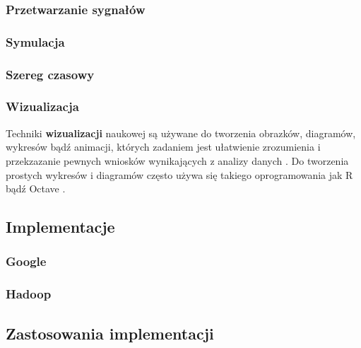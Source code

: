 \subsubsection{Przetwarzanie sygnałów}
\label{sub:przetwarzanie_sygnalow}

\subsubsection{Symulacja}
\label{sub:symulacja}

\subsubsection{Szereg czasowy}
\label{sub:szereg_czasowy}

\subsubsection{Wizualizacja}
\label{sub:wizualizacja}
Techniki \textbf{wizualizacji} naukowej są używane do tworzenia obrazków, diagramów, wykresów bądź animacji, których zadaniem jest ułatwienie zrozumienia i przekzazanie pewnych wniosków wynikających z analizy danych \cite{lawrence1994}. Do tworzenia prostych wykresów i diagramów często używa się takiego oprogramowania jak R \cite{www:R} bądź Octave \cite{www:octave}.

\subsection{Implementacje}

\subsubsection{Google}
\label{ssub:google}

\subsubsection{Hadoop}
\label{ssub:hadoop}

\subsection{Zastosowania implementacji}


